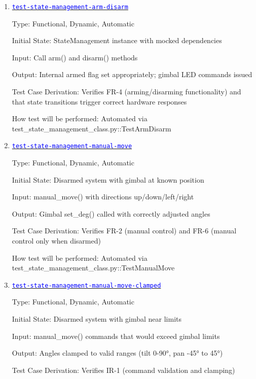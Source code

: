 \documentclass[12pt, titlepage]{article}
\newcommand{\tid}[1]{\hyperlink{tid:#1}{\textcolor{blue}{\texttt{#1}}}}
\begin{document}
\begin{enumerate}

  \item{\tid{test-state-management-arm-disarm}\\}

        Type: Functional, Dynamic, Automatic

        Initial State: StateManagement instance with mocked dependencies

        Input: Call arm() and disarm() methods

        Output: Internal armed flag set appropriately; gimbal LED commands issued

        Test Case Derivation: Verifies FR-4 (arming/disarming functionality) and that
        state transitions trigger correct hardware responses

        How test will be performed: Automated via
        test\_state\_management\_class.py::TestArmDisarm

  \item{\tid{test-state-management-manual-move}\\}

        Type: Functional, Dynamic, Automatic

        Initial State: Disarmed system with gimbal at known position

        Input: manual\_move() with directions up/down/left/right

        Output: Gimbal set\_deg() called with correctly adjusted angles

        Test Case Derivation: Verifies FR-2 (manual control) and FR-6 (manual control
        only when disarmed)

        How test will be performed: Automated via
        test\_state\_management\_class.py::TestManualMove

  \item{\tid{test-state-management-manual-move-clamped}\\}

        Type: Functional, Dynamic, Automatic

        Initial State: Disarmed system with gimbal near limits

        Input: manual\_move() commands that would exceed gimbal limits

        Output: Angles clamped to valid ranges (tilt 0-90°, pan -45° to 45°)

        Test Case Derivation: Verifies IR-1 (command validation and clamping)


\end{enumerate}
\end{document}
